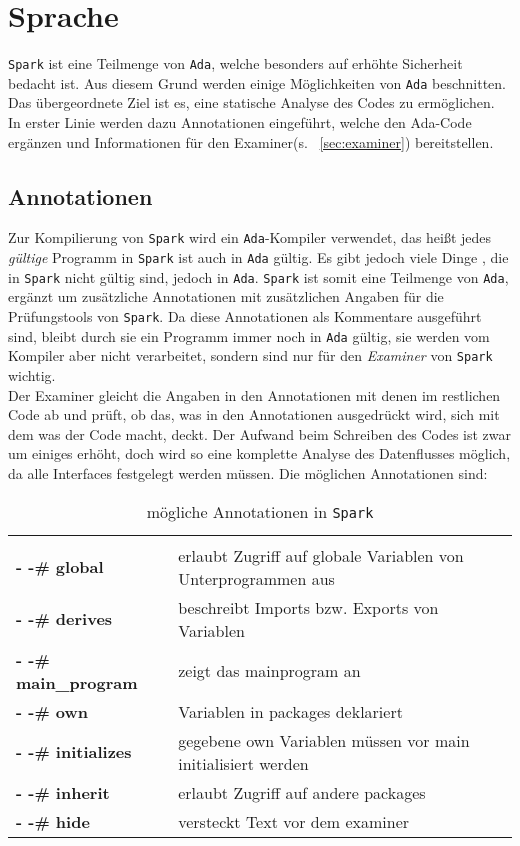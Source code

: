 \section{Sprache}
\label{sec:Sprache}
\texttt{Spark} ist eine Teilmenge von \texttt{Ada}, welche besonders auf erhöhte Sicherheit bedacht ist. Aus diesem Grund werden einige Möglichkeiten von \texttt{Ada} beschnitten. Das übergeordnete Ziel ist es, eine statische Analyse des Codes zu ermöglichen. In erster Linie werden dazu Annotationen eingeführt, welche den Ada-Code ergänzen und Informationen für den Examiner(s. ~\ref{sec:examiner}) bereitstellen.

\subsection{Annotationen}
\label{subsec:Annotationen}
Zur Kompilierung von \texttt{Spark} wird ein \texttt{Ada}-Kompiler verwendet, das heißt jedes \textit{gültige} Programm in \texttt{Spark} ist auch in \texttt{Ada} gültig. Es gibt jedoch viele Dinge , die in \texttt{Spark} nicht gültig sind, jedoch in \texttt{Ada}. \texttt{Spark} ist somit eine Teilmenge von \texttt{Ada}, ergänzt um zusätzliche Annotationen mit zusätzlichen Angaben für die Prüfungstools von \texttt{Spark}. Da diese Annotationen als Kommentare ausgeführt sind, bleibt durch sie ein Programm immer noch in \texttt{Ada} gültig, sie werden vom Kompiler aber nicht verarbeitet, sondern sind nur für den \textit{Examiner} von \texttt{Spark} wichtig.\\
Der Examiner gleicht die Angaben in den Annotationen mit denen im restlichen Code ab und prüft, ob das, was in den Annotationen ausgedrückt wird, sich mit dem was der Code macht, deckt. Der Aufwand beim Schreiben des Codes ist zwar um einiges erhöht, doch wird so eine komplette Analyse des Datenflusses möglich, da alle Interfaces festgelegt werden müssen.
Die möglichen Annotationen sind:
\begin{table}[h!]
\centering
\caption{mögliche Annotationen in \texttt{Spark}}
\label{tab:annotations}
\begin{tabular}{ll}
&\\
\textbf{- -\# global} & erlaubt Zugriff auf globale Variablen von Unterprogrammen aus\\
\textbf{- -\# derives} & beschreibt Imports bzw. Exports von Variablen\\
\textbf{- -\# main\_program} & zeigt das mainprogram an\\
\textbf{- -\# own} & Variablen in packages deklariert\\
\textbf{- -\# initializes} & gegebene own Variablen müssen vor main initialisiert werden\\
\textbf{- -\# inherit} & erlaubt Zugriff auf andere packages\\
\textbf{- -\# hide} & versteckt Text vor dem examiner\\
\end{tabular}
\end{table}



